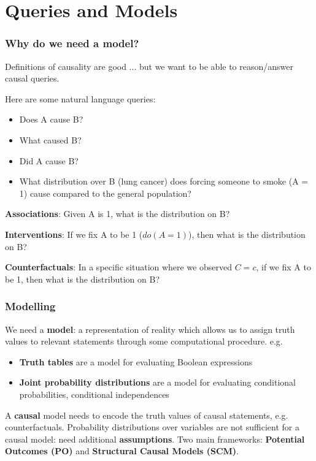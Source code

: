 \documentclass[handout]{beamer}
\begin{document}
\section{Queries and Models}

\begin{frame}
\frametitle{Why do we need a model?}
Definitions of causality are good ... but we want to be able to reason/answer causal queries. 
\pause

Here are some natural language queries:
\pause
\begin{itemize}
	\item Does A cause B?
	\pause
	\item What caused B?
	\pause
	\item Did A cause B?
	\pause
	\item What distribution over B (lung cancer) does forcing someone to smoke (A = 1) cause compared to the general population?
	\pause
\end{itemize}

\textbf{Associations}: Given A is 1, what is the distribution on B?
\pause

\textbf{Interventions}: If we fix A to be 1 ($do(A=1)$), then what is the distribution on B?
\pause

\textbf{Counterfactuals}: In a specific situation where we observed $C=c$, if we fix A to be 1, then what is the distribution on B?
\pause
\end{frame}

\begin{frame}

\frametitle{Modelling}

We need a \textbf{model}: a representation of reality which allows us to assign truth values to relevant statements through some computational procedure.
\pause
e.g. 
\begin{itemize}
	\item \textbf{Truth tables} are a model for evaluating Boolean expressions
	\item \textbf{Joint probability distributions} are a model for evaluating conditional probabilities, conditional independences
\end{itemize}
\pause
A \textbf{causal} model needs to encode the truth values of causal statements, e.g. counterfactuals. Probability distributions over variables are not sufficient for a causal model: need additional \textbf{assumptions}.
\pause
\bigskip
Two main frameworks: \textbf{Potential Outcomes (PO)} and \textbf{Structural Causal Models (SCM)}.


\end{frame}
\end{document}
